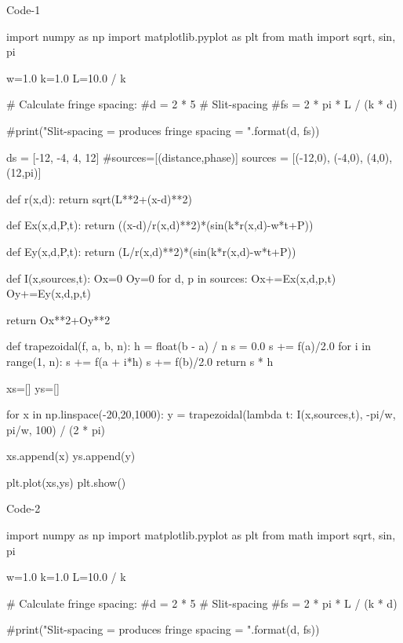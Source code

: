 Code-1

import numpy as np
import matplotlib.pyplot as plt
from math import sqrt, sin, pi

w=1.0
k=1.0
L=10.0 / k

# Calculate fringe spacing:
#d = 2 * 5           
# Slit-spacing
#fs = 2 * pi * L / (k * d)

#print("Slit-spacing = {} produces fringe spacing = {}".format(d, fs))


ds = [-12, -4, 4, 12]
#sources=[(distance,phase)]
sources = [(-12,0), (-4,0), (4,0), (12,pi)]

def r(x,d):
    return sqrt(L**2+(x-d)**2)
    
def Ex(x,d,P,t):
    return ((x-d)/r(x,d)**2)*(sin(k*r(x,d)-w*t+P))

def Ey(x,d,P,t):
    return (L/r(x,d)**2)*(sin(k*r(x,d)-w*t+P))
       
def I(x,sources,t):
    Ox=0
    Oy=0
    for d, p in sources:
        Ox+=Ex(x,d,p,t)
        Oy+=Ey(x,d,p,t)
    
    return Ox**2+Oy**2
        
def trapezoidal(f, a, b, n):
    h = float(b - a) / n
    s = 0.0
    s += f(a)/2.0
    for i in range(1, n):
        s += f(a + i*h)
    s += f(b)/2.0
    return s * h

xs=[]
ys=[]

for x in np.linspace(-20,20,1000):
    y = trapezoidal(lambda t: I(x,sources,t), -pi/w, pi/w, 100) / (2 * pi)
   
    xs.append(x)
    ys.append(y)

plt.plot(xs,ys)
plt.show()   

Code-2

import numpy as np
import matplotlib.pyplot as plt
from math import sqrt, sin, pi

w=1.0
k=1.0
L=10.0 / k

# Calculate fringe spacing:
#d = 2 * 5           
# Slit-spacing
#fs = 2 * pi * L / (k * d)

#print("Slit-spacing = {} produces fringe spacing = {}".format(d, fs))


